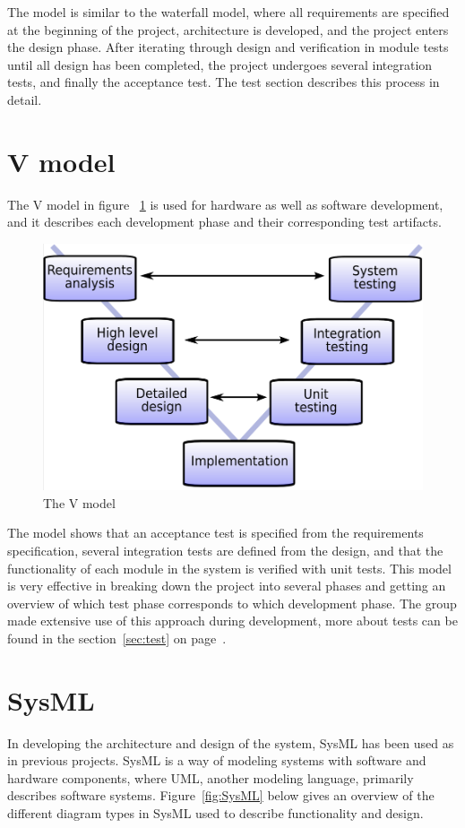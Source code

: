 The model is similar to the waterfall model, where all requirements are specified at the beginning of the project, architecture is developed, and the project enters the design phase. After iterating through design and verification in module tests until all design has been completed, the project undergoes several integration tests, and finally the acceptance test. The test section describes this process in detail.

\section{V model}
The V model in figure ~\ref{fig:V_model} is used for hardware as well as software development, and it describes each development phase and their corresponding test artifacts. 

\begin{figure}[H]
	\centering
	\includegraphics[max width=0.7\linewidth]{V_model.png}
	\caption{The V model}
	\label{fig:V_model}
\end{figure}

The model shows that an acceptance test is specified from the requirements specification, several integration tests are defined from the design, and that the functionality of each module in the system is verified with unit tests. This model is very effective in breaking down the project into several phases and getting an overview of which test phase corresponds to which development phase. The group made extensive use of this approach during development, more about tests can be found in the section~\ref{sec:test} on page~\pageref{sec:test}.

\section{SysML}

In developing the architecture and design of the system, SysML has been used as in previous projects. SysML is a way of modeling systems with software and hardware components, where UML, another modeling language, primarily describes software systems. Figure~\ref{fig:SysML} below gives an overview of the different diagram types in SysML used to describe functionality and design.

